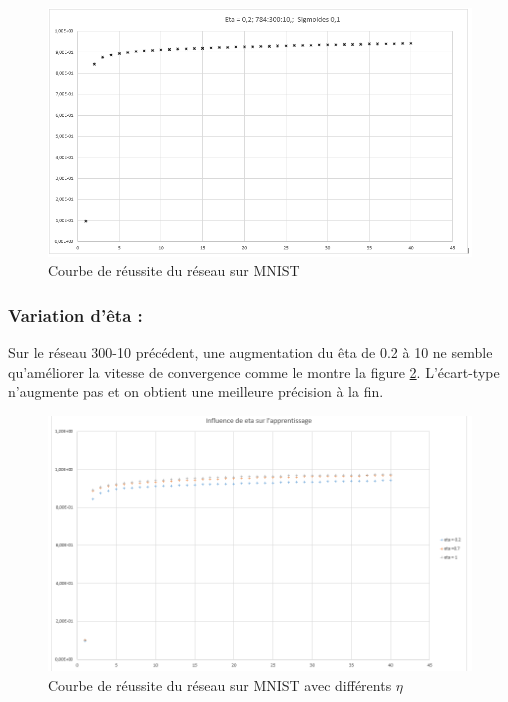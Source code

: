 \begin{figure}[ht!]
  \includegraphics[width=\linewidth]{fig/MNIST_result_1.png}
  \caption{Courbe de réussite du réseau sur MNIST}
  \label{fig:mnist_result_1}
\end{figure}

\subsubsection*{Variation d’êta :}


Sur le réseau 300-10 précédent, une augmentation du êta de 0.2 à 10 ne semble qu’améliorer la vitesse de convergence comme le montre la figure \ref{fig:mnist_influence_eta}. 
L’écart-type n’augmente pas et on obtient une meilleure précision à la fin.

\begin{figure}[ht!]
  \includegraphics[width=\linewidth]{fig/MNIST_influence_eta.png}
  \caption{Courbe de réussite du réseau sur MNIST avec différents $\eta$}
  \label{fig:mnist_influence_eta}
\end{figure}


